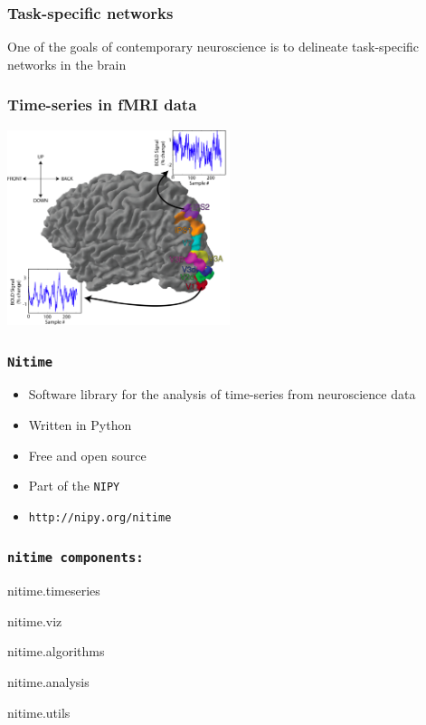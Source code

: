 \documentclass{beamer}
\begin{document}
\begin{frame}
\frametitle{Task-specific networks}
  One of the goals of contemporary neuroscience is to delineate task-specific
  networks in the brain
\end{frame}

\begin{frame}
\frametitle{Time-series in fMRI data}
\includegraphics[height=5.7cm]{figures/brain_w_tseries}
\end{frame}

\begin{frame}
\frametitle{\tt{Nitime}}
\begin{itemize}
\pause
\item
Software library for the analysis of time-series from neuroscience data
\pause
\item
Written in Python
\pause
\item 
Free and open source
\pause
\item
Part of the \tt{NIPY} 
\pause
\item
\tt{http://nipy.org/nitime}
\end{itemize}
\end{frame}

\begin{frame}
\frametitle{\tt{nitime} components:}
\begin{itemize}
\begin{tt}
\pause
\item
nitime.timeseries
\pause
\item
nitime.viz
\pause
\item
nitime.algorithms
\pause
\item
nitime.analysis
\pause 
\item
nitime.utils
\end{tt}
\end{itemize}
\end{frame}
\end{document}
